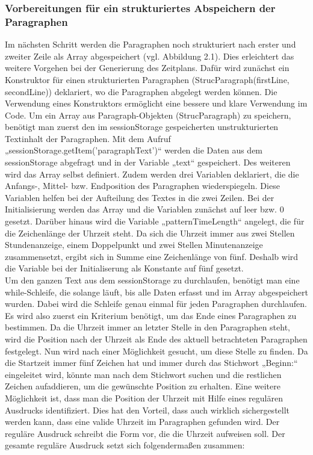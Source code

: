 \subsubsection{Vorbereitungen für ein strukturiertes Abspeichern der Paragraphen}
Im nächsten Schritt werden die Paragraphen noch strukturiert nach erster und zweiter Zeile als Array abgespeichert (vgl. Abbildung 2.1). Dies erleichtert das weitere Vorgehen bei der Generierung des Zeitplans. Dafür wird zunächst ein Konstruktor für einen strukturierten Paragraphen (StrucParagraph(firstLine, secondLine)) deklariert, wo die Paragraphen abgelegt werden können. Die Verwendung eines Konstruktors ermöglicht eine bessere und klare Verwendung im Code. Um ein Array aus Paragraph-Objekten (StrucParagraph) zu speichern, benötigt man zuerst den im sessionStorage gespeicherten unstrukturierten Textinhalt der Paragraphen. Mit dem Aufruf „sessionStorage.getItem('paragraphText')“ werden die Daten aus dem sessionStorage abgefragt und in der Variable „text“ gespeichert. Des weiteren wird das Array selbst definiert. Zudem werden drei Variablen deklariert, die die Anfangs-, Mittel- bzw. Endposition des Paragraphen wiederspiegeln. Diese Variablen helfen bei der Aufteilung des Textes in die zwei Zeilen. Bei der Initialisierung werden das Array und die Variablen zunächst auf leer bzw. 0 gesetzt. Darüber hinaus wird die Variable „patternTimeLength“ angelegt, die für die Zeichenlänge der Uhrzeit steht. Da sich die Uhrzeit immer aus zwei Stellen Stundenanzeige, einem Doppelpunkt und zwei Stellen Minutenanzeige zusammensetzt, ergibt sich in Summe eine Zeichenlänge von fünf. Deshalb wird die Variable bei der Initialiserung als Konstante auf fünf gesetzt.\\
Um den ganzen Text aus dem sessionStorage zu durchlaufen, benötigt man eine while-Schleife, die solange läuft, bis alle Daten erfasst und im Array abgespeichert wurden. Dabei wird die Schleife genau einmal für jeden Paragraphen durchlaufen. Es wird also zuerst ein Kriterium benötigt, um das Ende eines Paragraphen zu bestimmen. Da die Uhrzeit immer an letzter Stelle in den Paragraphen steht, wird die Position nach der Uhrzeit als Ende des aktuell betrachteten Paragraphen festgelegt. Nun wird nach einer Möglichkeit gesucht, um diese Stelle zu finden. Da die Startzeit immer fünf Zeichen hat und immer durch das Stichwort „Beginn:“ eingeleitet wird, könnte man nach dem Stichwort suchen und die restlichen Zeichen aufaddieren, um die gewünschte Position zu erhalten. Eine weitere Möglichkeit ist, dass man die Position der Uhrzeit mit Hilfe eines regulären Ausdrucks identifiziert. Dies hat den Vorteil, dass auch wirklich sichergestellt werden kann, dass eine valide Uhrzeit im Paragraphen gefunden wird. Der reguläre Ausdruck schreibt die Form vor, die die Uhrzeit aufweisen soll. Der gesamte reguläre Ausdruck setzt sich folgendermaßen zusammen:
